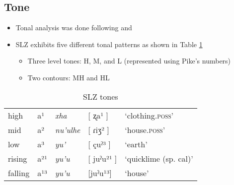 \documentclass[12pt, letterpaper]{article}
\providecommand{\lsptoprule}{\midrule\toprule}
\providecommand{\lspbottomrule}{\bottomrule\midrule}
\begin{document}
\subsection{Tone} \label{sec:Tone}

\begin{itemize}
	\item Tonal analysis was done following \citet{pikeToneLanguagesTechnique1948} and \citet{sniderToneAnalysisField2018}

	\item SLZ exhibits five different tonal patterns as shown in Table \ref{tab:tones}
		\begin{itemize}
			\item Three level tones: H, M, and L (represented using Pike's numbers)
			\item Two contours: MH and HL
		\end{itemize}
\end{itemize}

\begin{table}[!h]
\centering
\caption{SLZ tones}
\label{tab:tones}
 \begin{tabular}{lllll}
  \lsptoprule
  high   	&  a¹  &  \textit{xha}   &  [ ʐa¹ ] & `clothing.\textsc{poss}'\\
	mid    	&  a²  &  \textit{nu'ulhe} 	& [ ɾiʒ² ] & `house.\textsc{poss}' \\
	low   	&  a³  &  \textit{yu'} 	&	 [ çuˀ³ ] & `earth'\\
	rising	&  a²¹  &  \textit{yu'u} 	&	[ juˀu²¹ ] & `quicklime (sp. cal)' \\
	falling &  a¹³  &  \textit{yu'u}  &	[juˀu¹³] &	`house' \\
  \lspbottomrule
 \end{tabular}
\end{table}
\end{document}
